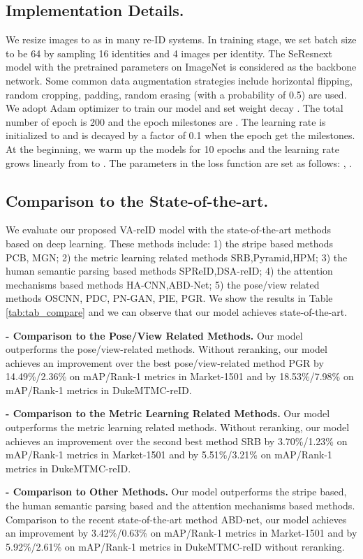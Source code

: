 \documentclass[letterpaper]{article} \usepackage{aaai20}  \usepackage{times}  \usepackage{helvet} \usepackage{courier}  \usepackage[hyphens]{url}  \usepackage{graphicx} \usepackage{array}
\begin{document}
\subsection{Implementation Details.}
We resize images to  as in many re-ID systems. In training stage, we set batch size to be 64 by sampling 16 identities and 4 images per identity. The SeResnext model with the pretrained parameters on ImageNet is considered as the backbone network. Some common data augmentation strategies include horizontal flipping, random cropping, padding, random erasing (with a probability of 0.5) are used. We adopt Adam optimizer to train our model and set weight decay . The total number of epoch is 200 and the epoch milestones are . The learning rate is initialized to  and is decayed by a factor of 0.1 when the epoch get the milestones. At the beginning, we warm up the models for 10 epochs and the learning rate grows linearly from  to . The parameters in the loss function are set as follows: , . 

\subsection{Comparison to the State-of-the-art.}
We evaluate our proposed VA-reID model with the state-of-the-art methods based on deep learning. These methods include: 1) the stripe based methods PCB, MGN; 2) the metric learning related methods SRB,Pyramid,HPM; 3) the human semantic parsing based methods SPReID,DSA-reID; 4) the attention mechanisms based methods HA-CNN,ABD-Net; 5) the pose/view related methods OSCNN, PDC, PN-GAN, PIE, PGR. We show the results in Table \ref{tab:tab_compare} and we can observe that our model achieves state-of-the-art. 


\noindent \textbf{ - Comparison to the Pose/View Related Methods.}
Our model outperforms the pose/view-related methods. Without reranking, our model achieves an improvement over the best pose/view-related method PGR by 14.49\%/2.36\% on mAP/Rank-1 metrics in Market-1501 and by 18.53\%/7.98\% on mAP/Rank-1 metrics in DukeMTMC-reID.


\noindent \textbf{ - Comparison to the Metric Learning Related Methods.}
Our model outperforms the metric learning related methods. Without reranking, our model achieves an improvement over the second best method SRB by 3.70\%/1.23\% on mAP/Rank-1 metrics in Market-1501 and by 5.51\%/3.21\% on mAP/Rank-1 metrics in DukeMTMC-reID.


\noindent \textbf{ - Comparison to Other Methods.}
Our model outperforms the stripe based, the human semantic parsing based and the attention mechanisms based methods. Comparison to the recent state-of-the-art method ABD-net, our model achieves an improvement by 3.42\%/0.63\% on mAP/Rank-1 metrics in Market-1501 and by 5.92\%/2.61\% on mAP/Rank-1 metrics in DukeMTMC-reID without reranking.
\end{document}
